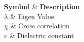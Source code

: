 {
	\hline
	\textbf{Symbol} & \textbf{Description}  \\
	\hline
	$\lambda$ & Eigen Value\\
	
	$\chi$ & Cross correlation\\
	
	$\varepsilon $ & Dielectric constant\\
	\hline
}